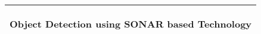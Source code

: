 %
%
%
%
%
\begin{titlepage}
  \addtolength{\hoffset}{0.5\evensidemargin-0.5\oddsidemargin} %
  \noindent%
  \begin{tabular}{@{}p{\textwidth}@{}}
    \toprule[2pt]
    \midrule
    \vspace{0.2cm}
    \begin{center}
    \Huge{\textbf{
      Object Detection using SONAR based Technology%
    }}
    \end{center}

    \vspace{0.2cm}\\
    \midrule
    \toprule[2pt]


\end{tabular}
\end{titlepage}
